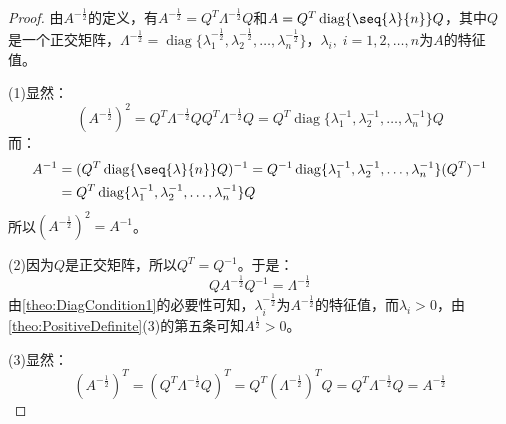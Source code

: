 \begin{proof}
	由$A^{-\frac{1}{2}}$的定义，有$A^{-\frac{1}{2}}=Q^T\varLambda^{-\frac{1}{2}}Q$和$A=Q^T\operatorname{diag}\{\seq{\lambda}{n}\}Q$，其中$Q$是一个正交矩阵，$\varLambda^{-\frac{1}{2}}=\operatorname{diag}\{\lambda_1^{-\frac{1}{2}},\lambda_2^{-\frac{1}{2}},\dots,\lambda_n^{-\frac{1}{2}}\}$，$\lambda_i,\;i=1,2,\dots,n$为$A$的特征值。\par
	(1)显然：
	\begin{equation*}
		(A^{-\frac{1}{2}})^2=Q^T\varLambda^{-\frac{1}{2}}QQ^T\varLambda^{-\frac{1}{2}}Q=Q^T\operatorname{diag}\{\lambda_1^{-1},\lambda_2^{-1},\dots,\lambda_n^{-1}\}Q
	\end{equation*}
	而：
	\begin{align*}
		A^{-1}&=(Q^T\operatorname{diag}\{\seq{\lambda}{n}\}Q)^{-1}=Q^{-1}\operatorname{diag}\{\lambda_1^{-1},\lambda_2^{-1},\dots,\lambda_n^{-1}\}(Q^T)^{-1} \\
		&=Q^T\operatorname{diag}\{\lambda_1^{-1},\lambda_2^{-1},\dots,\lambda_n^{-1}\}Q
	\end{align*}
	所以$(A^{-\frac{1}{2}})^2=A^{-1}$。\par
	(2)因为$Q$是正交矩阵，所以$Q^T=Q^{-1}$。于是：
	\begin{equation*}
		QA^{-\frac{1}{2}}Q^{-1}=\varLambda^{-\frac{1}{2}}
	\end{equation*}
	由\cref{theo:DiagCondition1}的必要性可知，$\lambda_i^{-\frac{1}{2}}$为$A^{-\frac{1}{2}}$的特征值，而$\lambda_i>0$，由\cref{theo:PositiveDefinite}(3)的第五条可知$A^{\frac{1}{2}}>0$。\par
	(3)显然：
	\begin{equation*}
		(A^{-\frac{1}{2}})^T=(Q^T\varLambda^{-\frac{1}{2}} Q)^T=Q^T(\varLambda^{-\frac{1}{2}})^TQ=Q^T\varLambda^{-\frac{1}{2}}Q=A^{-\frac{1}{2}}
	\end{equation*}
\end{proof}